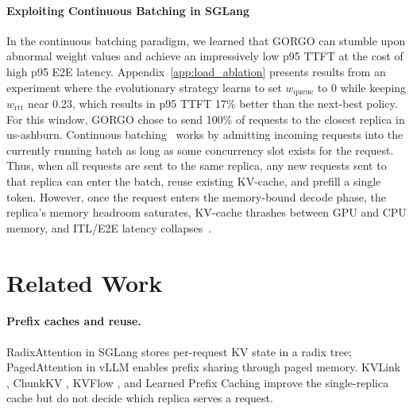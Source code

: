\documentclass{article}
\begin{document}
\paragraph{Exploiting Continuous Batching in SGLang}
\label{sec:results:hacking}
In the continuous batching paradigm, we learned that GORGO can stumble upon abnormal weight values and achieve an impressively low p95 TTFT at the cost of high p95 E2E latency.
Appendix~\ref{app:load_ablation} presents results from an experiment where the evolutionary strategy learns to set $w_{\mathrm{queue}}$
to 0 while keeping $w_{\mathrm{rtt}}$ near 0.23, which results in p95 TTFT 17\% better than the next-best policy. For this window,
GORGO chose to send 100\% of requests to the closest replica in us-ashburn. Continuous batching~\citep{orca2022} works by admitting incoming requests into the currently
running batch as long as some concurrency slot exists for the request. Thus, when all requests are sent to the same replica, any new requests sent to that replica can enter the batch, reuse existing KV-cache,
and prefill a single token. However, once the request enters the memory-bound decode phase, the replica's memory headroom saturates, KV-cache thrashes between GPU and CPU memory, and ITL/E2E latency collapses~\citep{orca2022, vllm2023}. 




\section{Related Work}
\label{sec:related}

\paragraph{Prefix caches and reuse.}
RadixAttention in SGLang \citep{sglang2024} stores per-request KV state in a
radix tree; PagedAttention in vLLM \citep{vllm2023} enables prefix sharing
through paged memory. KVLink \citep{kvlink2025}, ChunkKV \citep{chunkkv2025},
KVFlow \citep{kvflow2025}, and Learned Prefix Caching \citep{lpc2025} improve
the single-replica cache but do not decide which replica serves a request.
\end{document}
